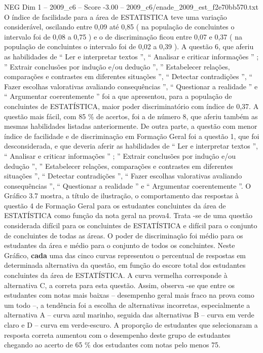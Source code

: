 \begin{textsample}{NEG Dim 1 – 2009\_c6 – Score -3.00 – 2009\_c6/enade\_2009\_est\_f2e70bb570.txt}
O índice de facilidade para a área de ESTATISTICA teve uma variação considerável, oscilando entre 0,09 até 0,85 ( na população de concluintes o intervalo foi de 0,08 a 0,75 ) e o de discriminação ficou entre 0,07 e 0,37 ( na população de concluintes o intervalo foi de 0,02 a 0,39 ).
A questão 6, que aferiu as habilidades de “ Ler e interpretar textos ”, “ Analisar e criticar informações ” ; ” Extrair conclusões por indução e/ou dedução ”, ” Estabelecer relações, comparações e contrastes em diferentes situações ”, “ Detectar contradições ”, “ Fazer escolhas valorativas avaliando consequências ”, “ Questionar a realidade ” e “ Argumentar coerentemente ” foi a que apresentou, para a população de concluintes de ESTATÍSTICA, maior poder discriminatório com índice de 0,37.
A questão mais fácil, com 85 \% de acertos, foi a de número 8, que aferiu também as mesmas habilidades listadas anteriormente.
De outra parte, a questão com menor índice de facilidade e de discriminação em Formação Geral foi a questão 1, que foi desconsiderada, e que deveria aferir as habilidades de “ Ler e interpretar textos ”, “ Analisar e criticar informações ” ; ” Extrair conclusões por indução e/ou dedução ”, ” Estabelecer relações, comparações e contrastes em diferentes situações ”, “ Detectar contradições ”, “ Fazer escolhas valorativas avaliando consequências ”, “ Questionar a realidade ” e “ Argumentar coerentemente ”.
O Gráfico 3.7 mostra, a título de ilustração, o comportamento das respostas à questão 4 de Formação Geral para os estudantes concluintes da área de ESTATÍSTICA como função da nota geral na prova4.
Trata -se de uma questão considerada difícil para os concluintes de ESTATÍSTICA e difícil para o conjunto de concluintes de todas as áreas.
O poder de discriminação foi médio para os estudantes da área e médio para o conjunto de todos os concluintes.
Neste Gráfico, \textbf{cada} uma das cinco curvas representou o percentual de respostas em determinada alternativa da questão, em função do escore total dos estudantes concluintes da área de ESTATÍSTICA.
A curva vermelha corresponde à alternativa C, a correta para esta questão.
Assim, observa -se que entre os estudantes com notas mais baixas – desempenho geral mais fraco na prova como um todo –, a tendência foi a escolha de alternativas incorretas, especialmente a alternativa A – curva azul marinho, seguida das alternativas B – curva em verde claro e D – curva em verde-escuro.
A proporção de estudantes que selecionaram a resposta correta aumentou com o desempenho deste grupo de estudantes chegando ao acerto de 65 \% dos estudantes com notas pelo menos 75.

\end{textsample}
